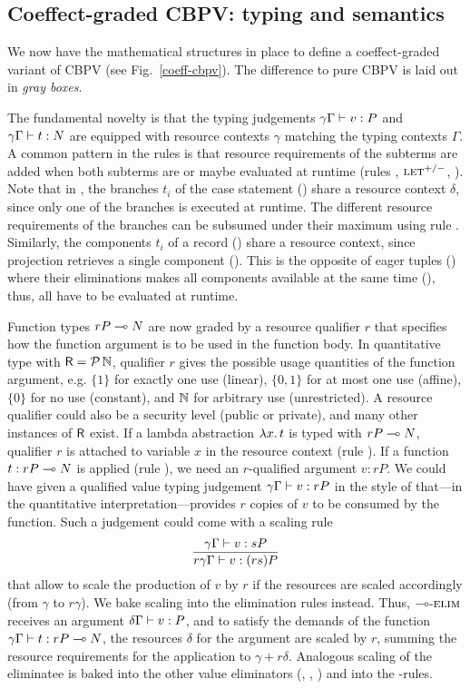 \documentclass[acmsmall,review,anonymous]{acmart}\settopmatter{printfolios=true,printccs=false,printacmref=false}
\begin{document}
\subsection{Coeffect-graded CBPV: typing and semantics}

We now have the mathematical structures in place to define a
coeffect-graded variant of CBPV (see Fig.~\ref{coeff-cbpv}).
The difference to pure CBPV is laid out in \emph{gray boxes}.

The fundamental novelty is that the typing judgements
$\gamma\Gamma \vdash v : P$ and $\gamma\Gamma \vdash t : N$ are
equipped with resource contexts $\gamma$ matching the typing contexts
$\Gamma$.  A common pattern in the rules is that resource requirements
of the subterms are added when both subterms are or maybe evaluated at
runtime (rules \rintro\otimes, $\mbox{\textsc{let}}^{+/-}$,
\relim{\Box/\GS/\otimes/\diamond/\lolli}).  Note that in \relim\GS,
the branches $t_i$ of the case statement (\relim\GS) share a resource
context $\delta$, since only one of the branches is executed at
runtime.  The different resource requirements of the branches can be
subsumed under their maximum using rule \rweak.  Similarly, the
components $t_i$ of a record (\rintro\Pi) share a resource context,
since projection retrieves a single component (\relim\Pi).  This is
the opposite of eager tuples (\rintro\otimes) where their eliminations
makes all components available at the same time (\relim\otimes), thus,
all have to be evaluated at runtime.

Function types $rP \multimap N$ are now graded by a resource qualifier
$r$ that specifies how the function argument is to be used in the
function body.  In quantitative type with $\mathsf{R} = \mathcal{P}\,\mathbb{N}$, qualifier
$r$ gives the possible usage quantities of the function argument,
e.g. $\{1\}$ for exactly one use (linear), $\{0,1\}$ for at most one
use (affine), $\{0\}$ for no use (constant), and $\mathbb{N}$ for arbitrary
use (unrestricted).  A resource qualifier could also be a security
level (public or private), and many other instances of $\mathsf{R}$ exist.  If
a lambda abstraction $\lambda x.\,t$ is typed with $rP \multimap N$, qualifier
$r$ is attached to variable $x$ in the resource context (rule
\rintro\lolli).  If a function $t : rP \multimap N$ is applied (rule
\relim\lolli), we need an $r$-qualified argument $v : rP$.  We could
have given a qualified value typing judgement
$\gamma\Gamma \vdash v : rP$ in the style of
\citet{mcBride:wadler60} that---in the quantitative
interpretation---provides $r$ copies of $v$ to be consumed by the
function.  Such a judgement could come with a scaling rule
\[
\dfrac{\gamma\Gamma \vdash v : sP
  }{r\gamma\Gamma \vdash v : (rs)P}
\]
that allow to scale the production of $v$ by $r$ if the resources are
scaled accordingly (from $\gamma$ to $r\gamma$).  We bake scaling into
the elimination rules instead.  Thus, $\mathord{\multimap}\mbox{-\ensuremath{\mbox{\textsc{elim}}}}$ receives an
argument $\delta\Gamma \vdash v : P$, and to satisfy the demands of
the function $\gamma\Gamma \vdash t : rP \multimap N$, the resources
$\delta$ for the argument are scaled by $r$, summing the resource
requirements for the application to $\gamma + r\delta$.
%
Analogous scaling of the eliminatee is baked into the other value
eliminators (\relim\Box, \relim\GS, \relim\otimes) and into the
\rlet-rules.
\end{document}
